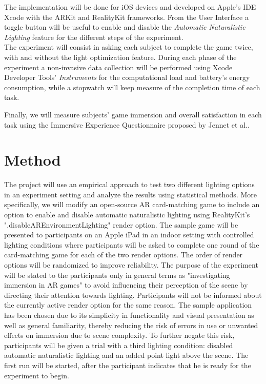 \documentclass[12pt,twoside,english]{article}
\begin{document}
The implementation will be done for iOS devices and developed on Apple's IDE Xcode with the ARKit and RealityKit frameworks. From the User Interface a toggle button will be useful to enable and disable the \emph{Automatic Naturalistic Lighting} feature for the different steps of the experiment. \\

The experiment will consist in asking each subject to complete the game twice, with and without the light optimization feature. During each phase of the experiment a non-invasive data collection will be performed using Xcode Developer Tools' \emph{Instruments} for the computational load and battery's energy consumption, while a stopwatch will keep measure of the completion time of each task.

Finally, we will measure subjects' game immersion and overall satisfaction in each task using the Immersive Experience Questionnaire proposed by Jennet et al.\cite{jennett_measuring_2008}.

\section{Method}
\label{sect:method}

The project will use an empirical approach to test two different lighting options in an experiment setting and analyze the results using statistical methods.
More specifically, we will modify an open-source \gls{AR} card-matching game \cite{cobb_maxxfrazerrealitykit-cardflip_2020} to include an option to enable and disable automatic naturalistic lighting using RealityKit's ".disableAREnvironmentLighting" render option.
The sample game will be presented to participants on an Apple iPad in an indoor setting with controlled lighting conditions where participants will be asked to complete one round of the card-matching game for each of the two render options.
The order of render options will be randomized to improve reliability.
The purpose of the experiment will be stated to the participants only in general terms as "investigating immersion in \gls{AR} games" to avoid influencing their perception of the scene by directing their attention towards lighting.
Participants will not be informed about the currently active render option for the same reason.
The sample application has been chosen due to its simplicity in functionality and visual presentation as well as general familiarity, thereby reducing the risk of errors in use or unwanted effects on immersion due to scene complexity.
To further negate this risk, participants will be given a trial with a third lighting condition: disabled automatic naturalistic lighting and an added point light above the scene.
The first run will be started, after the participant indicates that he is ready for the experiment to begin.
\end{document}
